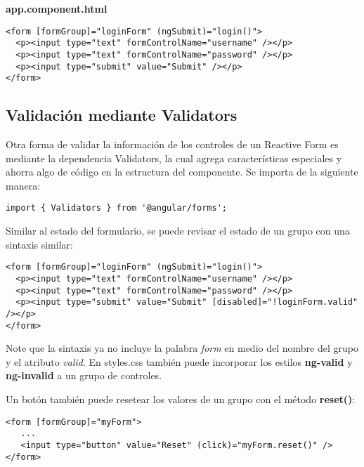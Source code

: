 \textbf{app.component.html}
\begin{lstlisting}[style=htmlcssjs]
<form [formGroup]="loginForm" (ngSubmit)="login()">
  <p><input type="text" formControlName="username" /></p>
  <p><input type="text" formControlName="password" /></p>
  <p><input type="submit" value="Submit" /></p>
</form>
\end{lstlisting}


\subsection{Validación mediante Validators}

Otra forma de validar la información de los controles de un Reactive Form es mediante la dependencia Validators, la cual agrega características especiales y ahorra algo de código en la estructura del componente. Se importa de la siguiente manera:
\begin{lstlisting}[style=htmlcssjs]
import { Validators } from '@angular/forms';
\end{lstlisting}

Similar al estado del formulario, se puede revisar el estado de un grupo con una sintaxis similar:
\begin{lstlisting}[style=htmlcssjs]
<form [formGroup]="loginForm" (ngSubmit)="login()">
  <p><input type="text" formControlName="username" /></p>
  <p><input type="text" formControlName="password" /></p>
  <p><input type="submit" value="Submit" [disabled]="!loginForm.valid" /></p>
</form>
\end{lstlisting}

Note que la sintaxis ya no incluye la palabra \textit{form} en medio del nombre del grupo y el atributo \textit{valid}. En styles.css también puede incorporar los estilos \textbf{ng-valid} y \textbf{ng-invalid} a un grupo de controles.

Un botón también puede resetear los valores de un grupo con el método \textbf{reset()}:
\begin{lstlisting}[style=htmlcssjs]
<form [formGroup]="myForm">
   ...
   <input type="button" value="Reset" (click)="myForm.reset()" />
</form>
\end{lstlisting}